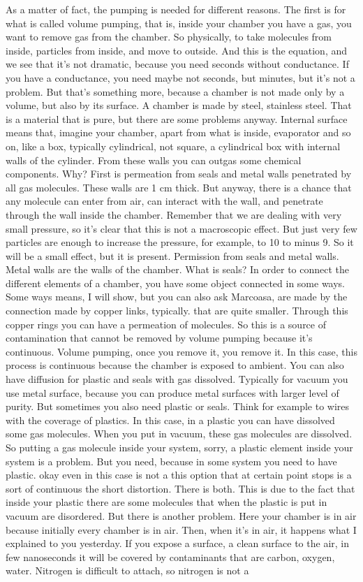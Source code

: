 As a matter of fact, the pumping is needed for different reasons. The first is for what is called volume pumping, that is, inside your chamber you have a gas, you want to remove gas from the chamber. So physically, to take molecules from inside, particles from inside, and move to outside. And this is the equation, and we see that it's not dramatic, because you need seconds without conductance. If you have a conductance, you need maybe not seconds, but minutes, but it's not a problem. But that's something more, because a chamber is not made only by a volume, but also by its surface. A chamber is made by steel, stainless steel. That is a material that is pure, but there are some problems anyway. Internal surface means that, imagine your chamber, apart from what is inside, evaporator and so on, like a box, typically cylindrical, not square, a cylindrical box with internal walls of the cylinder. From these walls you can outgas some chemical components. Why? First is permeation from seals and metal walls penetrated by all gas molecules. These walls are 1 cm thick. But anyway, there is a chance that any molecule can enter from air, can interact with the wall, and penetrate through the wall inside the chamber. Remember that we are dealing with very small pressure, so it's clear that this is not a macroscopic effect. But just very few particles are enough to increase the pressure, for example, to 10 to minus 9. So it will be a small effect, but it is present. Permission from seals and metal walls. Metal walls are the walls of the chamber. What is seals? In order to connect the different elements of a chamber, you have some object connected in some ways. Some ways means, I will show, but you can also ask Marcoasa, are made by the connection made by copper links, typically. that are quite smaller. Through this copper rings you can have a permeation of molecules. So this is a source of contamination that cannot be removed by volume pumping because it's continuous. Volume pumping, once you remove it, you remove it. In this case, this process is continuous because the chamber is exposed to ambient. You can also have diffusion for plastic and seals with gas dissolved. Typically for vacuum you use metal surface, because you can produce metal surfaces with larger level of purity. But sometimes you also need plastic or seals. Think for example to wires with the coverage of plastics. In this case, in a plastic you can have dissolved some gas molecules. When you put in vacuum, these gas molecules are dissolved. So putting a gas molecule inside your system, sorry, a plastic element inside your system is a problem. But you need, because in some system you need to have plastic. okay even in this case is not a this option that at certain point stops is a sort of continuous the short distortion. There is both. This is due to the fact that inside your plastic there are some molecules that when the plastic is put in vacuum are disordered. But there is another problem. Here your chamber is in air because initially every chamber is in air. Then, when it's in air, it happens what I explained to you yesterday. If you expose a surface, a clean surface to the air, in few nanoseconds it will be covered by contaminants that are carbon, oxygen, water. Nitrogen is difficult to attach, so nitrogen is not a 